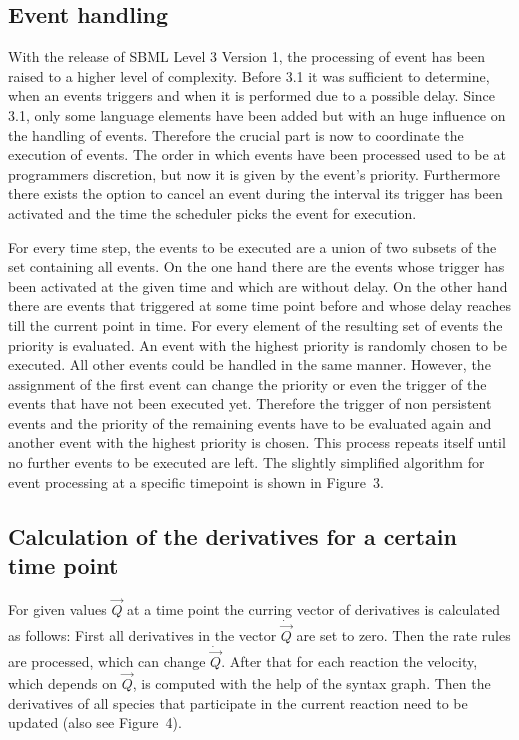 \documentclass[10pt]{bmc_article}
\newenvironment{bmcformat}{\baselineskip20pt\sloppy\setboolean{publ}{false}}{\baselineskip20pt\sloppy}
\begin{document}
\begin{bmcformat}
\subsection*{Event handling}
With the release of SBML Level 3 Version 1, the processing of event has been raised to a higher level of 
complexity. Before 3.1 it was sufficient to determine, when an events triggers and when it is performed 
due to a possible delay. Since 3.1, only some language elements have been added but with an huge 
influence on the handling of events. Therefore the crucial part is now to coordinate the execution of events. 
The order in which events have been processed used to be at programmers discretion, but now it is given 
by the event's priority. Furthermore there exists the option to cancel an event during the interval its trigger 
has been activated and the time the scheduler picks the event for execution. 

For every time step, the events to be executed are a union of two subsets of the set containing all events.
On the one hand there are the events whose trigger has been activated at the given time and which are without delay. On the other hand there are events that triggered at some time point before and whose delay reaches till the current point in time. For every element of the resulting set of events the priority is evaluated.
An event with the highest priority is randomly chosen to be executed. All other events
could be handled in the same manner. However, the assignment of the first event can change the priority or even the trigger of the events that have not been executed yet. Therefore the trigger of non persistent events and the priority of the remaining events have to be evaluated again and another event with the highest priority is chosen. This process repeats itself until no further events to be executed are left. The slightly simplified algorithm for event processing at a specific timepoint is shown in Figure~3.

\subsection*{Calculation of the derivatives for a certain time point}
For given values $\vec{Q}$ at a time point the curring vector of derivatives is calculated as follows: First all derivatives in the vector $\dot{\vec{Q}}$ are set to zero. Then the rate rules are processed, which can change $\dot{\vec{Q}}$. After that for each reaction the velocity, which depends on $\vec{Q}$, is computed with the help of the syntax graph. Then the derivatives of all species that participate in the current reaction need to be updated (also see Figure~4).


\end{bmcformat}
\end{document}
